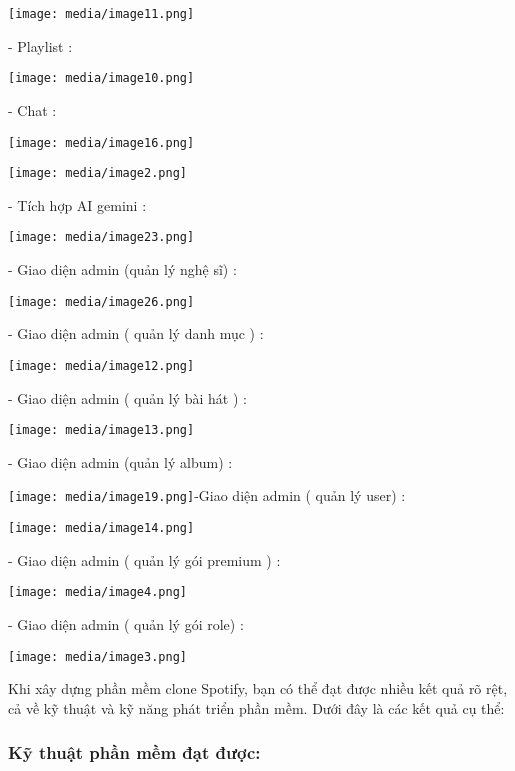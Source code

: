 \documentclass{article}
\begin{document}
\texttt{[image: media/image11.png]}

- Playlist :

\texttt{[image: media/image10.png]}

- Chat :

\texttt{[image: media/image16.png]}

\texttt{[image: media/image2.png]}

- Tích hợp AI gemini :

\texttt{[image: media/image23.png]}

- Giao diện admin (quản lý nghệ sĩ) :

\texttt{[image: media/image26.png]}

- Giao diện admin ( quản lý danh mục ) :

\texttt{[image: media/image12.png]}

- Giao diện admin ( quản lý bài hát ) :

\texttt{[image: media/image13.png]}

- Giao diện admin (quản lý album) :

\texttt{[image: media/image19.png]}-Giao
diện admin ( quản lý user) :

\texttt{[image: media/image14.png]}

- Giao diện admin ( quản lý gói premium ) :

\texttt{[image: media/image4.png]}

- Giao diện admin ( quản lý gói role) :

\texttt{[image: media/image3.png]}

Khi xây dựng phần mềm clone Spotify, bạn có thể đạt được nhiều kết quả
rõ rệt, cả về kỹ thuật và kỹ năng phát triển phần mềm. Dưới đây là các
kết quả cụ thể:

\subsubsection{\texorpdfstring{ \textbf{Kỹ thuật phần mềm đạt
được:}}{ Kỹ thuật phần mềm đạt được:}}\label{kux1ef9-thuux1eadt-phux1ea7n-mux1ec1m-ux111ux1ea1t-ux111ux1b0ux1ee3c}
\end{document}
